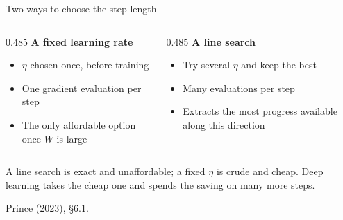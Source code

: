 \documentclass[aspectratio=169, 11pt]{beamer}
\newcommand{\srcline}[1]{%
  \par\vspace{0.25em}%
  {\scriptsize\color{mcMuted}\hfill #1\par}}
\newcommand{\src}[3]{}      %
\begin{document}
\begin{frame}{Two ways to choose the step length}
  \src{prince2023}{section}{6.1}
  \begin{columns}[T, onlytextwidth]
    \begin{column}{0.485\textwidth}
      \textbf{A fixed learning rate}\vspace{0.35em}
      \begin{itemize}\itemsep0.3em
        \item $\eta$ chosen once, before training
        \item One gradient evaluation per step
        \item The only affordable option once $W$ is large
      \end{itemize}
    \end{column}
    \begin{column}{0.485\textwidth}
      \textbf{A line search}\vspace{0.35em}
      \begin{itemize}\itemsep0.3em
        \item Try several $\eta$ and keep the best
        \item Many evaluations per step
        \item Extracts the most progress available along this direction
      \end{itemize}
    \end{column}
  \end{columns}
  \vspace{0.8em}
  \begin{redhighlight}
    A line search is exact and unaffordable; a fixed $\eta$ is crude and
    cheap. Deep learning takes the cheap one and spends the saving on
    many more steps.
  \end{redhighlight}
  \srcline{Prince (2023), \S6.1.}
\end{frame}
\end{document}
